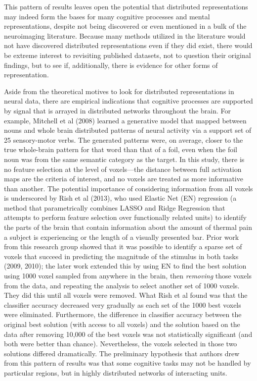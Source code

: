 This pattern of results leaves open the potential that distributed representations may indeed form the bases for many cognitive processes and mental representations, despite not being discovered or even mentioned in a bulk of the neuroimaging literature. Because many methods utilized in the literature would not have discovered distributed representations even if they did exist, there would be extreme interest to revisiting published datasets, not to question their original findings, but to see if, additionally, there is evidence for other forms of representation.

Aside from the theoretical motives to look for distributed representations in neural data, there are empirical indications that cognitive processes are supported by signal that is arrayed in distributed networks throughout the brain. For example, Mitchell et al (2008) learned a generative model that mapped between nouns and whole brain distributed patterns of neural activity via a support set of 25 sensory-motor verbs. The generated patterns were, on average, closer to the true whole-brain pattern for that word than that of a foil, even when the foil noun was from the same semantic category as the target. In this study, there is no feature selection at the level of voxels---the distance between full activation maps are the criteria of interest, and no voxels are treated as more informative than another. The potential importance of considering information from all voxels is underscored by Rish et al (2013), who used Elastic Net (EN) regression (a method that parametrically combines LASSO and Ridge Regression that attempts to perform feature selection over functionally related units) to identify the parts of the brain that contain information about the amount of thermal pain a subject is experiencing or the length of a visually presented bar. Prior work from this research group showed that it was possible to identify a sparse set of voxels that succeed in predicting the magnitude of the stimulus in both tasks (2009, 2010); the later work extended this by using EN to find the best solution using 1000 voxel sampled from anywhere in the brain, then {\em removing} those voxels from the data, and  repeating the analysis to select another set of 1000 voxels. They did this until all voxels were removed. What Rish et al found was that the classifier accuracy decreased very gradually as each set of the 1000 best voxels were eliminated. Furthermore, the difference in classifier accuracy between the original best solution (with access to all voxels) and the solution based on the data after removing 10,000 of the best voxels was not statistically significant (and both were better than chance). Nevertheless, the voxels selected in those two solutions differed dramatically.  The preliminary hypothesis that authors drew from this pattern of results was that some cognitive tasks may not be handled by particular regions, but in highly distributed networks of interacting units.

